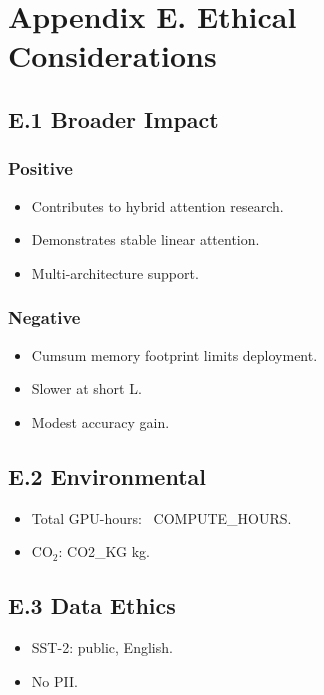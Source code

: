 \section{Appendix E. Ethical Considerations}

\subsection{E.1 Broader Impact}

\subsubsection{Positive}
\begin{itemize}
\item Contributes to hybrid attention research.
\item Demonstrates stable linear attention.
\item Multi-architecture support.

\end{itemize}
\subsubsection{Negative}
\begin{itemize}
\item Cumsum memory footprint limits deployment.
\item Slower at short L.
\item Modest accuracy gain.

\end{itemize}
\subsection{E.2 Environmental}

\begin{itemize}
\item Total GPU-hours: ~{{COMPUTE\_HOURS}}.
\item CO$_2$: {{CO2\_KG}} kg.

\end{itemize}
\subsection{E.3 Data Ethics}

\begin{itemize}
\item SST-2: public, English.
\item No PII.

\end{itemize}
